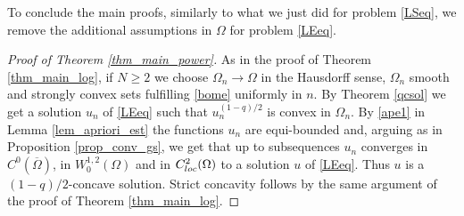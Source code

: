\documentclass[12pt]{amsart}
\numberwithin{equation}{section}
\theoremstyle{plain}
\theoremstyle{plain}
\theoremstyle{plain}
\theoremstyle{definition}
\renewcommand{\ge}{\geqslant}
\begin{document}
To conclude the main proofs, similarly to what we just did for problem \eqref{LSeq}, we remove the additional assumptions in $\Omega$ for problem \eqref{LEeq}.

\begin{proof}[Proof of Theorem \ref{thm_main_power}]
As in the proof of Theorem \ref{thm_main_log}, if $N\ge 2$ we choose $\Omega_n \to \Omega$ in the Hausdorff sense, $\Omega_n$ smooth and strongly convex sets fulfilling \eqref{bome} uniformly in $n$. By Theorem \ref{qcsol} 
we get a solution $u_n$ of \eqref{LEeq} such that $u_n^{(1-q)/2}$ is convex in $\Omega_n$.
 By \eqref{ape1} in Lemma \ref{lem_apriori_est} the functions $u_n$ are equi-bounded and, arguing as in Proposition \ref{prop_conv_gs}, 
 we get that up to subsequences $u_n$ converges in $C^0(\overline{\Omega})$, in $W^{1,2}_0(\Omega)$ and in $C^2_{\rm loc}(\Omega)$ to a solution $u$ of \eqref{LEeq}. Thus $u$ is a $(1-q)/2$-concave solution. 
Strict concavity follows by the same argument of the proof of Theorem \ref{thm_main_log}.
\end{proof}
 
\end{document}
